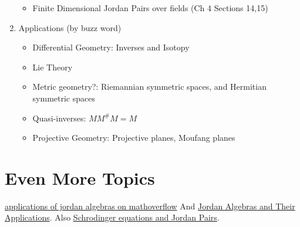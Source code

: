 \documentclass[12pt]{amsart}
\begin{document}
\begin{enumerate}
\begin{itemize}
        \item Finite Dimensional Jordan Pairs over fields (Ch 4 Sections 14,15)
    \end{itemize}
    \item Applications (by buzz word)
    \begin{itemize}
        \item Differential Geometry: Inverses and Isotopy
        \item Lie Theory
        \item Metric geometry?: Riemannian symmetric spaces, and Hermitian symmetric spaces
        \item Quasi-inverses: $MM^\#M=M$
        \item Projective Geometry: Projective planes, Moufang planes
    \end{itemize}
\end{enumerate}

\section*{Even More Topics}
\href{https://mathoverflow.net/questions/230159/applications-of-jordan-algebras}{applications of jordan algebras on mathoverflow} And 
\href{https://www.ams.org/journals/bull/1978-84-04/S0002-9904-1978-14503-0/S0002-9904-1978-14503-0.pdf}{Jordan Algebras and Their Applications}. Also \href{https://link.springer.com/article/10.1007/BF02099265}{Schrodinger equations and Jordan Pairs}.

\end{document}
